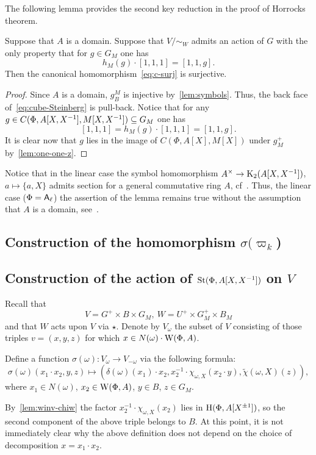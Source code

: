 The following lemma provides the second key reduction in the proof of Horrocks theorem.
\begin{lemma}
    Suppose that $A$ is a domain.
    Suppose that $V/\sim_W$ admits an action of $G$ with the only property that
      for $g \in G_M$ one has \[ h_M(g) \cdot [1, 1, 1] = [1, 1, g]. \]
    Then the canonical homomorphism~\eqref{eq:c-surj} is surjective.
\end{lemma}
\begin{proof}
  Since $A$ is a domain, $g^M_B$ is injective by~\cref{lem:symbols}.
    Thus, the back face of~\eqref{eq:cube-Steinberg} is pull-back.
  Notice that for any $g \in C(\Phi, A[X, X^{-1}], M[X, X^{-1}]) \subseteq G_M$ one has
    \[ [1, 1, 1] = h_M(g) \cdot [1, 1, 1] = [1, 1, g].\]
  It is clear now that $g$ lies in the image of $C(\Phi, A[X], M[X])$ under $g^+_M$ by~\cref{lem:one-one-z}.
\end{proof}

\begin{rem}
    Notice that in the linear case the symbol homomorphism $A^\times \to \operatorname{K}_2(A[X, X^{-1}])$, $a \mapsto \{a, X\}$ admits section
     for a general commutative ring $A$, cf~\cite{Wa71}.
    Thus, the linear case ($\Phi = \mathsf{A}_\ell$) the assertion of the lemma remains true without the assumption that $A$ is a domain, see~\cite[Lemma~3.1g]{Tu83}.
\end{rem}

\subsection{Construction of the homomorphism $\sigma(\varpi_k$)} \label{subsec:construction-sigma}


\subsection{Construction of the action of $\operatorname{St}(\Phi, A[X, X^{-1}])$ on $V$} \label{sec:construction-delta}
Recall that \[V = G^+ \times B \times G_M,\ W = U^+ \times G_M^+ \times B_M\]
and that $W$ acts upon $V$ via $\star$.
Denote by $V_\omega$ the subset of $V$ consisting of those triples $v = (x, y, z)$ for which $x \in N(\omega)\cdot \operatorname{W}(\Phi, A)$.


\begin{dfn} \label{sigma-def}
  Define a function $\sigma(\omega) \colon V_\omega \to V_{-\omega}$ via the following formula:
  \begin{equation} \label{eq:sigma-def} \sigma(\omega)(x_1 \cdot x_2, y, z) \mapsto (\delta(\omega)(x_1)\cdot x_2, x_2^{-1} \cdot \chi_{\omega, X}(x_2 \cdot y), \widetilde{\chi}(\omega, X)(z)), \end{equation}
  where $x_1 \in N(\omega)$, $x_2 \in \operatorname{W}(\Phi, A)$,  $y \in B$, $z \in G_M$.

  By~\cref{lem:winv-chiw} the factor $x_2^{-1} \cdot \chi_{\omega, X}(x_2)$ lies in $\operatorname{H}(\Phi, A[X^{\pm 1}])$, so the second component of the above triple belongs to $B$. At this point, it is not immediately clear why the above definition does not depend on the choice of decomposition $x = x_1 \cdot x_2$.
\end{dfn}


